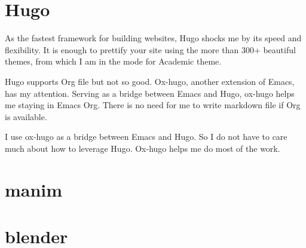 \documentclass[koma,utopia,letterpaper,captions=tableheading,11pt,listings-sv,microtype,paralist,colorlinks=true,urlcolor=blue]{org-article}
\begin{document}
\section{Hugo}
\label{sec:org4e548ff}


As the fastest framework for building websites, Hugo shocks me by its speed and
flexibility. It is enough to prettify your site using the more than 300+
beautiful themes, from which I am in the mode for Academic theme.

Hugo supports Org file but not so good. Ox-hugo, another extension of Emacs, has
my attention. Serving as a bridge between Emacs and Hugo, ox-hugo helps me
staying in Emacs Org. There is no need for me to write markdown file if Org is
available.

I use ox-hugo as a bridge between Emacs and Hugo. So I do not have to care much
about how to leverage Hugo. Ox-hugo helps me do most of the work.

\section{manim}
\label{sec:org74b3895}



\section{blender}
\label{sec:orge510532}
\end{document}

